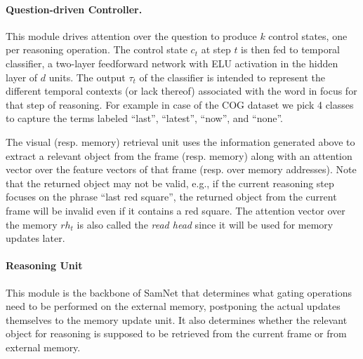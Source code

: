 \paragraph{Question-driven Controller.}

%

This module drives attention over the question to produce $k$ control states, one per reasoning operation. 
The control state $c_t$ at step $t$ is then fed to temporal classifier, a two-layer feedforward network with ELU activation in the hidden layer of $d$ units.
The output $\tau_t$ of the classifier is intended to represent the different temporal contexts (or lack thereof) associated with the word in focus for that step of reasoning.	
For example in case of the COG dataset we pick 4 classes to capture the terms labeled ``last'', ``latest'', ``now'', and ``none''.

The visual (resp. memory) retrieval unit uses the information generated above to extract a relevant object from the frame (resp. memory)
along with an attention vector over the feature vectors of that frame (resp. over memory addresses). Note that the returned object may not be valid, 
e.g., if the current reasoning step focuses on the phrase ``last red square'', the returned object from the current frame
will be invalid even if it contains a red square. The attention vector over the memory $rh_t$ is also called the \emph{read head} since it will be used 
for memory updates later.

\paragraph{Reasoning Unit}
This module is the backbone of SamNet that determines what gating operations need to be performed on the external memory, postponing the actual updates
themselves to the memory update unit. It also determines whether the relevant object for reasoning is supposed to be retrieved from the current frame or from external memory.

